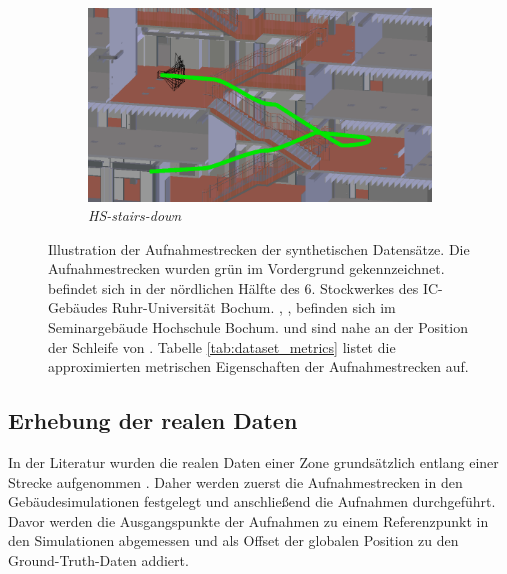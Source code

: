 \begin{figure}[H]
\begin{subfigure}[tl]{0.45\linewidth}
		\flushright		\includegraphics[width=\linewidth]{images/trajectories/traj-stairs-down.png}
		\caption{\textit{HS-stairs-down}}
		\label{subfig:traj_hs-down}
	\end{subfigure}
	\hfill
	\caption{Illustration der Aufnahmestrecken der synthetischen Datensätze. Die Aufnahmestrecken wurden grün im Vordergrund gekennzeichnet.  befindet sich in der nördlichen Hälfte des 6. Stockwerkes des IC-Gebäudes Ruhr-Universität Bochum. , ,  befinden sich im Seminargebäude Hochschule Bochum.  und  sind nahe an der Position der Schleife von . Tabelle \ref{tab:dataset_metrics} listet die approximierten metrischen Eigenschaften der Aufnahmestrecken auf.}
	\label{fig:trajectories}
\end{figure}


\subsection{Erhebung der realen Daten}
\label{subsec:record_real_data}
In der Literatur wurden die realen Daten einer Zone grundsätzlich entlang einer Strecke aufgenommen \cite{kendallPoseNetConvolutionalNetwork2015, clarkVidLocDeepSpatioTemporal2017, acharyaBIMPoseNetIndoorCamera2019}. Daher werden zuerst die Aufnahmestrecken in den Gebäudesimulationen festgelegt und anschließend die Aufnahmen durchgeführt. Davor werden die Ausgangspunkte der Aufnahmen zu einem Referenzpunkt in den Simulationen abgemessen und als Offset der globalen Position zu den Ground-Truth-Daten addiert.

